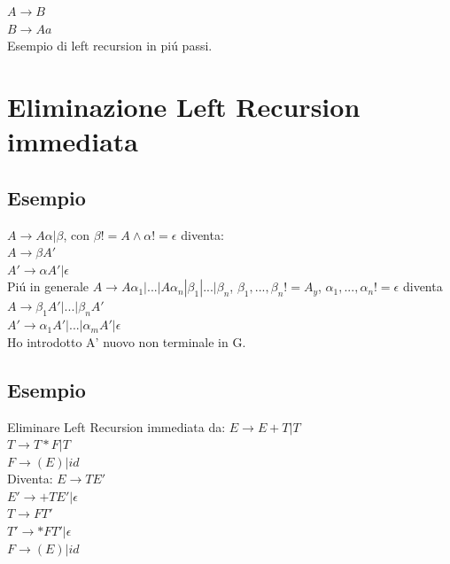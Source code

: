 $A \rightarrow B$\\
$B \rightarrow Aa$\\
Esempio di left recursion in pi\'u passi.

\section{Eliminazione Left Recursion immediata}

\subsection{Esempio}
$A \rightarrow A \alpha | \beta $, con $\beta != A \land \alpha != \epsilon$ diventa:\\
$A \rightarrow \beta A'$\\
$A' \rightarrow \alpha A' | \epsilon$\\

Pi\'u in generale
$A \rightarrow A\alpha _1 | ... | A\alpha _n | \beta _1 | ... | \beta _n $, $\beta _1, ..., \beta _n != A_y$, 
$\alpha_1,...,\alpha_n != \epsilon$ diventa\\
$A \rightarrow \beta _1 A'|...|\beta _n A' $\\
$A' \rightarrow \alpha _1 A'|...|\alpha _m A' | \epsilon $\\
Ho introdotto A' nuovo non terminale in G.

\subsection{Esempio}

Eliminare Left Recursion immediata da:
$E \rightarrow E + T | T $\\
$T \rightarrow T*F|T  $\\
$F \rightarrow (E)|id $\\

Diventa:
$E \rightarrow TE' $\\
$E' \rightarrow +TE'|\epsilon $\\
$T \rightarrow FT'  $\\
$T' \rightarrow *FT' | \epsilon $\\
$F \rightarrow (E)|id $\\

